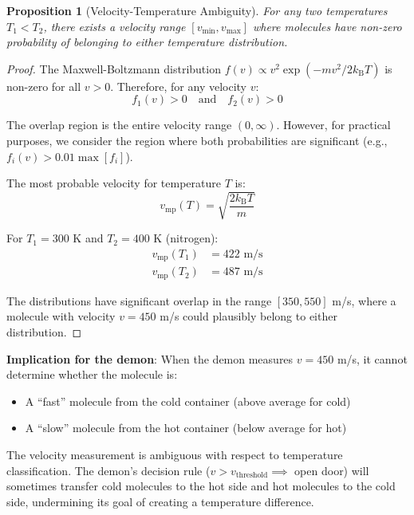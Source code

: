 \documentclass[10pt,twocolumn,letterpaper]{article}
\newtheorem{proposition}[theorem]{Proposition}
\theoremstyle{definition}
\theoremstyle{remark}
\newcommand{\kb}{k_\text{B}}
\begin{document}
\begin{proposition}[Velocity-Temperature Ambiguity]
\label{prop:velocity_temp_ambiguity}
For any two temperatures $T_1 < T_2$, there exists a velocity range $[v_{\min}, v_{\max}]$ where molecules have non-zero probability of belonging to either temperature distribution.
\end{proposition}

\begin{proof}
The Maxwell-Boltzmann distribution $f(v) \propto v^2 \exp(-mv^2/2\kb T)$ is non-zero for all $v > 0$. Therefore, for any velocity $v$:
\begin{equation}
f_1(v) > 0 \quad \text{and} \quad f_2(v) > 0
\end{equation}

The overlap region is the entire velocity range $(0, \infty)$. However, for practical purposes, we consider the region where both probabilities are significant (e.g., $f_i(v) > 0.01 \max[f_i]$).

The most probable velocity for temperature $T$ is:
\begin{equation}
v_{\text{mp}}(T) = \sqrt{\frac{2\kb T}{m}}
\end{equation}

For $T_1 = 300$ K and $T_2 = 400$ K (nitrogen):
\begin{align}
v_{\text{mp}}(T_1) &= 422 \text{ m/s} \\
v_{\text{mp}}(T_2) &= 487 \text{ m/s}
\end{align}

The distributions have significant overlap in the range $[350, 550]$ m/s, where a molecule with velocity $v = 450$ m/s could plausibly belong to either distribution.
\end{proof}

\textbf{Implication for the demon}: When the demon measures $v = 450$ m/s, it cannot determine whether the molecule is:
\begin{itemize}
\item A ``fast'' molecule from the cold container (above average for cold)
\item A ``slow'' molecule from the hot container (below average for hot)
\end{itemize}

The velocity measurement is ambiguous with respect to temperature classification. The demon's decision rule ($v > v_{\text{threshold}} \implies$ open door) will sometimes transfer cold molecules to the hot side and hot molecules to the cold side, undermining its goal of creating a temperature difference.
\end{document}
